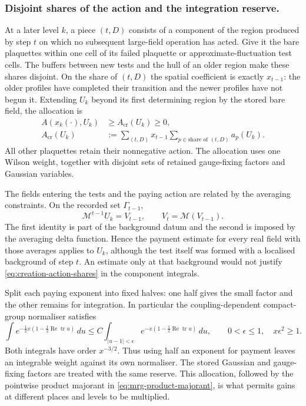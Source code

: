 \documentclass[11pt,letterpaper,reqno]{amsart}
\theoremstyle{definition}
\theoremstyle{remark}
\newcommand{\tr}{\operatorname{tr}}
\begin{document}
\subsubsection*{Disjoint shares of the action and the integration reserve.}

At a later level $k$, a piece $(t,D)$ consists of a component
of the region produced by step $t$ on which no subsequent
large-field operation has acted. Give it the bare plaquettes within one cell of its
failed plaquette or approximate-fluctuation test cells.
The buffers between new tests and the hull of an older region
make these shares disjoint. On the share of $(t,D)$ the spatial
coefficient is exactly $x_{t-1}$: the older profiles have
completed their transition and the newer profiles have not begun
it. Extending $U_k$ beyond its first determining region by the
stored bare field, the allocation is
\begin{equation}\label{eq:creation-action-shares}
 \begin{split}
 A(x_k(\cdot),U_k)&\ge A_{\mathrm{cr}}(U_k)\ge0,\\
 A_{\mathrm{cr}}(U_k)
       &:=\sum_{(t,D)}x_{t-1}
                    \sum_{p\in\text{share of }(t,D)}a_p(U_k).
 \end{split}
\end{equation}
All other plaquettes retain their nonnegative action. The
allocation uses one Wilson weight, together with disjoint sets
of retained gauge-fixing factors and Gaussian variables.

The fields entering the tests and the paying action are related
by the averaging constraints. On the recorded set $\Gamma_{t-1}$,
\[
 \mathcal M^{t-1}U_k=V_{t-1},\qquad
                         V_t=\mathcal M(V_{t-1}).
\]
The first identity is part of the background datum and the second
is imposed by the averaging delta function. Hence the payment
estimate for every real field with those averages applies to
$U_k$, although the test itself was formed with a localised
background of step $t$. An estimate only at that background
would not justify \eqref{eq:creation-action-shares} in the
component integrals.

Split each paying exponent into fixed halves: one half gives
the small factor and the other remains for integration. In
particular the coupling-dependent compact-group normaliser
satisfies
\[
 \int e^{-\frac12x(1-\frac12\operatorname{Re}\tr u)}\,du
 \le C\int_{|u-1|<\epsilon}
              e^{-x(1-\frac12\operatorname{Re}\tr u)}\,du,
 \qquad 0<\epsilon\le1,\quad x\epsilon^2\ge1.
\]
Both integrals have order $x^{-3/2}$. Thus using half an
exponent for payment leaves an integrable weight against its
own normaliser. The stored Gaussian and gauge-fixing factors
are treated with the same reserve. This allocation, followed by
the pointwise product majorant in
\eqref{eq:mrg-product-majorant}, is what permits gains at different
places and levels to be multiplied.
\end{document}
